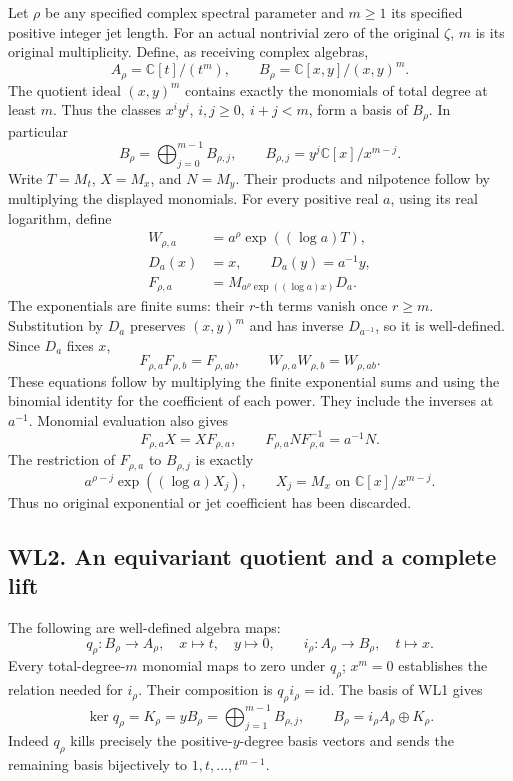 Let \(\rho\) be any specified complex spectral parameter and \(m\geq1\)
its specified positive integer jet length. For an actual nontrivial zero
of the original \(\zeta\), \(m\) is its original multiplicity. Define,
as receiving complex algebras, \[
 A_\rho=\mathbb C[t]/(t^m),\qquad
 B_\rho=\mathbb C[x,y]/(x,y)^m.
\tag{WL1.1}
\] The quotient ideal \((x,y)^m\) contains exactly the monomials of
total degree at least \(m\). Thus the classes \(x^iy^j\),
\(i,j\geq0,\ i+j<m\), form a basis of \(B_\rho\). In particular \[
 B_\rho=\bigoplus_{j=0}^{m-1}B_{\rho,j},\qquad
 B_{\rho,j}=y^j\mathbb C[x]/x^{m-j}.
\tag{WL1.2}
\] Write \(T=M_t\), \(X=M_x\), and \(N=M_y\). Their products and
nilpotence follow by multiplying the displayed monomials. For every
positive real \(a\), using its real logarithm, define \[
 \begin{aligned}
 W_{\rho,a}&=a^\rho\exp((\log a)T),\\
 D_a(x)&=x,\qquad D_a(y)=a^{-1}y,\\
 F_{\rho,a}&=M_{a^\rho\exp((\log a)x)}D_a.
 \end{aligned}
\tag{WL1.3}
\] The exponentials are finite sums: their \(r\)-th terms vanish once
\(r\geq m\). Substitution by \(D_a\) preserves \((x,y)^m\) and has
inverse \(D_{a^{-1}}\), so it is well-defined. Since \(D_a\) fixes
\(x\), \[
 F_{\rho,a}F_{\rho,b}=F_{\rho,ab},\qquad
 W_{\rho,a}W_{\rho,b}=W_{\rho,ab}.
\tag{WL1.4}
\] These equations follow by multiplying the finite exponential sums and
using the binomial identity for the coefficient of each power. They
include the inverses at \(a^{-1}\). Monomial evaluation also gives \[
 F_{\rho,a}X=XF_{\rho,a},\qquad
 F_{\rho,a}NF_{\rho,a}^{-1}=a^{-1}N.
\tag{WL1.5}
\] The restriction of \(F_{\rho,a}\) to \(B_{\rho,j}\) is exactly \[
 a^{\rho-j}\exp((\log a)X_j),\qquad X_j=M_x\text{ on }\mathbb C[x]/x^{m-j}.
\tag{WL1.6}
\] Thus no original exponential or jet coefficient has been discarded.

\subsection{WL2. An equivariant quotient and a complete
lift}\label{wl2.-an-equivariant-quotient-and-a-complete-lift}

The following are well-defined algebra maps: \[
 q_\rho:B_\rho\longrightarrow A_\rho,\quad x\longmapsto t,\quad y\longmapsto0,
 \qquad
 i_\rho:A_\rho\longrightarrow B_\rho,\quad t\longmapsto x.
\tag{WL2.1}
\] Every total-degree-\(m\) monomial maps to zero under \(q_\rho\);
\(x^m=0\) establishes the relation needed for \(i_\rho\). Their
composition is \(q_\rho i_\rho=\mathrm{id}\). The basis of WL1 gives \[
 \ker q_\rho=K_\rho=yB_\rho
 =\bigoplus_{j=1}^{m-1}B_{\rho,j},\qquad
 B_\rho=i_\rho A_\rho\oplus K_\rho.
\tag{WL2.2}
\] Indeed \(q_\rho\) kills precisely the positive-\(y\)-degree basis
vectors and sends the remaining basis bijectively to
\(1,t,\ldots,t^{m-1}\).

